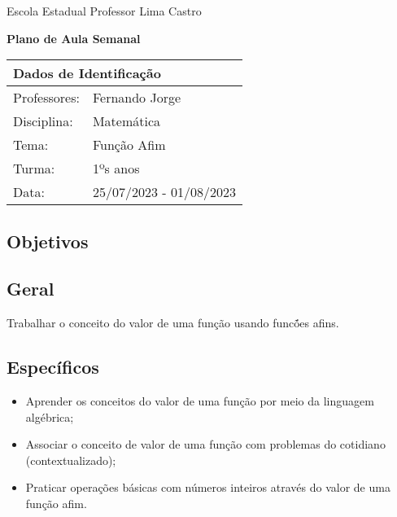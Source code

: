 \documentclass[oneside,a4paper,12pt]{article}
\newcommand{\universidade}{Escola Estadual Professor Lima Castro}
\newcommand{\professores}{Fernando Jorge}
\newcommand{\disciplina}{Matemática}
\newcommand{\tema}{Função Afim}
\newcommand{\turma}{1ºs anos}
\newcommand{\data}{25/07/2023 - 01/08/2023}
\begin{document}
  \pagestyle{empty}

	\begin{center}

	  \universidade
	  \par
	  \vspace{10pt}
	  \LARGE \textbf{Plano de Aula Semanal}

	\end{center}

  \vspace{10pt}

	\begin{tabular}{ |l|p{12cm}| }

	  \hline
	  \multicolumn{2}{|l|}{\textbf{Dados de Identificação}} \\
	  \hline
	  Professores:         &    \professores           \\
	  \hline
	  Disciplina:        &    \disciplina          \\
	  \hline
	  Tema:              &    \tema                \\
	  \hline
	  Turma:             &    \turma               \\
	  \hline
	  Data:              &    \data                \\
	  \hline

	\end{tabular}

  \begin{snugshade}
  \section{Objetivos} %
  \end{snugshade}

  \subsection{Geral} %

  Trabalhar o conceito do valor de uma função usando funcṍes afins.

  \subsection{Específicos} %

    \begin{itemize}

      \item Aprender os conceitos do valor de uma função por meio da linguagem
          algébrica;
      \item Associar o conceito de valor de uma função com problemas do cotidiano
          (contextualizado);
      \item Praticar operações básicas com números inteiros através do valor de uma função afim.

    \end{itemize}
\end{document}

